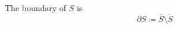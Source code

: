 \documentclass[11pt]{book}
\begin{document}
\newpage

\begin{defn}[Boundary]\label{defn:boundary}
    The boundary of $S$ is 
    \[
    \partial S \coloneqq \bar{S} \setminus \mathring{S} 
    \]
\end{defn}


\end{document}
